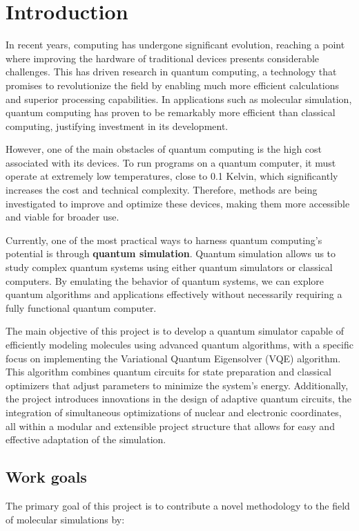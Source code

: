 
\chapter{Introduction}

In recent years, computing has undergone significant evolution, reaching a point where improving the hardware of traditional devices presents considerable challenges. This has driven research in quantum computing, a technology that promises to revolutionize the field by enabling much more efficient calculations and superior processing capabilities. In applications such as molecular simulation, quantum computing has proven to be remarkably more efficient than classical computing, justifying investment in its development.

However, one of the main obstacles of quantum computing is the high cost associated with its devices. To run programs on a quantum computer, it must operate at extremely low temperatures, close to 0.1 Kelvin, which significantly increases the cost and technical complexity. Therefore, methods are being investigated to improve and optimize these devices, making them more accessible and viable for broader use.

Currently, one of the most practical ways to harness quantum computing's potential is through \textbf{quantum simulation}. Quantum simulation allows us to study complex quantum systems using either quantum simulators or classical computers. By emulating the behavior of quantum systems, we can explore quantum algorithms and applications effectively without necessarily requiring a fully functional quantum computer.

The main objective of this project is to develop a quantum simulator capable of efficiently modeling molecules using advanced quantum algorithms, with a specific focus on implementing the Variational Quantum Eigensolver (VQE) algorithm. This algorithm combines quantum circuits for state preparation and classical optimizers that adjust parameters to minimize the system's energy. Additionally, the project introduces innovations in the design of adaptive quantum circuits, the integration of simultaneous optimizations of nuclear and electronic coordinates, all within a modular and extensible project structure that allows for easy and effective adaptation of the simulation.

\section{Work goals}
The primary goal of this project is to contribute a novel methodology to the field of molecular simulations by:


